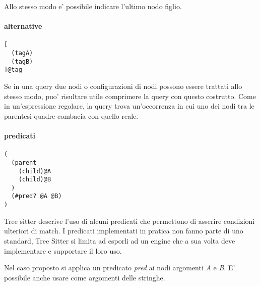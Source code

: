 Allo stesso modo e' possibile indicare l'ultimo nodo figlio.

\paragraph{alternative}

\begin{Verbatim}[samepage=true]
[
  (tagA)
  (tagB)
]@tag
\end{Verbatim}

Se in una query due nodi o configurazioni di nodi possono essere trattati allo stesso modo, puo' risultare utile comprimere la query con questo costrutto.
Come in un'espressione regolare, la query trova un'occorrenza in cui uno dei nodi tra le parentesi quadre combacia con quello reale.


\paragraph{predicati}

\begin{Verbatim}[samepage=true]
(
  (parent
    (child)@A
    (child)@B
  )
  (#pred? @A @B)
)
\end{Verbatim}

Tree sitter descrive l'uso di alcuni predicati che permettono di asserire condizioni ulteriori di match.
I predicati implementati in pratica non fanno parte di uno standard, Tree Sitter si limita ad esporli ad un engine che a sua volta deve implementare e supportare il loro uso.

Nel caso proposto si applica un predicato \emph{pred} ai nodi argomenti \emph{A} e \emph{B}.
E' possibile anche usare come argomenti delle stringhe.
